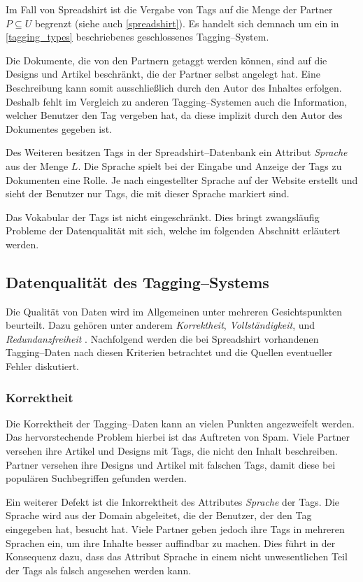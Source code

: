 Im Fall von Spreadshirt ist die Vergabe von Tags auf die Menge der Partner \(P \subseteq U\) begrenzt (siehe auch \cref{spreadshirt}). Es handelt sich demnach um ein in \cref{tagging_types} beschriebenes geschlossenes Tagging--System.

Die Dokumente, die von den Partnern getaggt werden können, sind auf die Designs und Artikel beschränkt, die der Partner selbst angelegt hat. Eine Beschreibung kann somit ausschließlich durch den Autor des Inhaltes erfolgen. Deshalb fehlt im Vergleich zu anderen Tagging--Systemen auch die Information, welcher Benutzer den Tag vergeben hat, da diese implizit durch den Autor des Dokumentes gegeben ist.

Des Weiteren besitzen Tags in der Spreadshirt--Datenbank ein Attribut \emph{Sprache} aus der Menge \(L\). Die Sprache spielt bei der Eingabe und Anzeige der Tags zu Dokumenten eine Rolle. Je nach eingestellter Sprache auf der Website erstellt und sieht der Benutzer nur Tags, die mit dieser Sprache markiert sind.

Das Vokabular der Tags ist nicht eingeschränkt. Dies bringt zwangsläufig Probleme der Datenqualität mit sich, welche im folgenden Abschnitt erläutert werden.

\subsection{Datenqualität des Tagging--Systems}
\label{quality}

Die Qualität von Daten wird im Allgemeinen unter mehreren Gesichtspunkten beurteilt. Dazu gehören unter anderem \emph{Korrektheit}, \emph{Vollständigkeit}, und \emph{Redundanzfreiheit} \cite[S. 84 f.]{hkp2012}. Nachfolgend werden die bei Spreadshirt vorhandenen Tagging--Daten nach diesen Kriterien betrachtet und die Quellen eventueller Fehler \cite[S. 43 f.]{jo2003} diskutiert.

\subsubsection{Korrektheit}

Die Korrektheit der Tagging--Daten kann an vielen Punkten angezweifelt werden. Das hervorstechende Problem hierbei ist das Auftreten von Spam. Viele Partner versehen ihre Artikel und Designs mit Tags, die nicht den Inhalt beschreiben. Partner versehen ihre Designs und Artikel mit falschen Tags, damit diese bei populären Suchbegriffen gefunden werden.

Ein weiterer Defekt ist die Inkorrektheit des Attributes \emph{Sprache} der Tags. Die Sprache wird aus der Domain abgeleitet, die der Benutzer, der den Tag eingegeben hat, besucht hat. Viele Partner geben jedoch ihre Tags in mehreren Sprachen ein, um ihre Inhalte besser auffindbar zu machen. Dies führt in der Konsequenz dazu, dass das Attribut Sprache in einem nicht unwesentlichen Teil der Tags als falsch angesehen werden kann.


